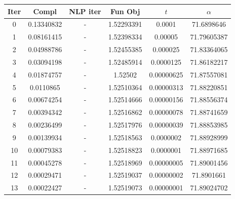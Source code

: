 \begin{tabular}{c c c c c c}
\toprule
Iter & Compl & NLP iter & Fun Obj & $t$ & $\alpha$ \\
\midrule
0 & 0.13340832 & - & 1.52293391 & 0.0001 & 71.6898646 \\
1 & 0.08161415 & - & 1.52398334 & 0.00005 & 71.79605387 \\
2 & 0.04988786 & - & 1.52455385 & 0.000025 & 71.83364065 \\
3 & 0.03094198 & - & 1.52485914 & 0.0000125 & 71.86182217 \\
4 & 0.01874757 & - & 1.52502 & 0.00000625 & 71.87557081 \\
5 & 0.0110865 & - & 1.52510364 & 0.00000313 & 71.88220851 \\
6 & 0.00674254 & - & 1.52514666 & 0.00000156 & 71.88556374 \\
7 & 0.00394342 & - & 1.52516862 & 0.00000078 & 71.88741659 \\
8 & 0.00236499 & - & 1.52517976 & 0.00000039 & 71.88853985 \\
9 & 0.00139934 & - & 1.52518563 & 0.0000002 & 71.88928999 \\
10 & 0.00079383 & - & 1.52518823 & 0.0000001 & 71.88971685 \\
11 & 0.00045278 & - & 1.52518969 & 0.00000005 & 71.89001456 \\
12 & 0.00029471 & - & 1.52519037 & 0.00000002 & 71.8901661 \\
13 & 0.00022427 & - & 1.52519073 & 0.00000001 & 71.89024702 \\
\bottomrule
\end{tabular}